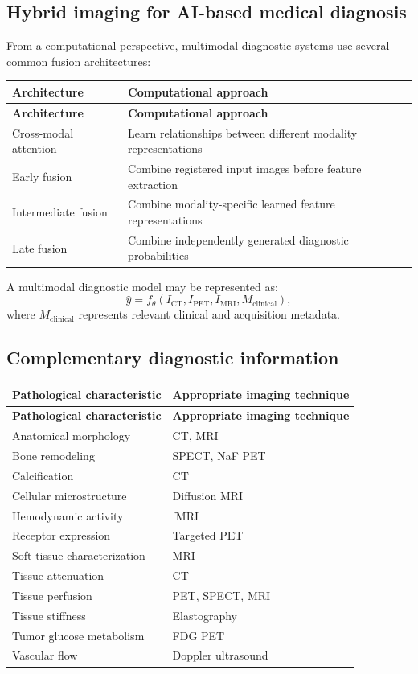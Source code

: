 \subsection{Hybrid imaging for AI-based medical diagnosis}
From a computational perspective, multimodal diagnostic systems use several common fusion architectures:
\begin{longtable}{@{}p{}p{}@{}}
\toprule
\textbf{Architecture} & \textbf{Computational approach} \\
\midrule
\endfirsthead
\toprule
\textbf{Architecture} & \textbf{Computational approach} \\
\midrule
\endhead
Cross-modal attention & Learn relationships between different modality representations \\
Early fusion & Combine registered input images before feature extraction \\
Intermediate fusion & Combine modality-specific learned feature representations \\
Late fusion & Combine independently generated diagnostic probabilities \\
\bottomrule
\end{longtable}
A multimodal diagnostic model may be represented as:
\begin{equation}
\hat{y}=f_{\theta}\left(I_{\mathrm{CT}},I_{\mathrm{PET}},I_{\mathrm{MRI}},M_{\mathrm{clinical}}\right),
\end{equation}
where $M_{\mathrm{clinical}}$ represents relevant clinical and acquisition metadata.

\subsection{Complementary diagnostic information}
\begin{longtable}{@{}p{}p{}@{}}
\toprule
\textbf{Pathological characteristic} & \textbf{Appropriate imaging technique} \\
\midrule
\endfirsthead
\toprule
\textbf{Pathological characteristic} & \textbf{Appropriate imaging technique} \\
\midrule
\endhead
Anatomical morphology & CT, MRI \\
Bone remodeling & SPECT, NaF PET \\
Calcification & CT \\
Cellular microstructure & Diffusion MRI \\
Hemodynamic activity & fMRI \\
Receptor expression & Targeted PET \\
Soft-tissue characterization & MRI \\
Tissue attenuation & CT \\
Tissue perfusion & PET, SPECT, MRI \\
Tissue stiffness & Elastography \\
Tumor glucose metabolism & FDG PET \\
Vascular flow & Doppler ultrasound \\
\bottomrule
\end{longtable}

